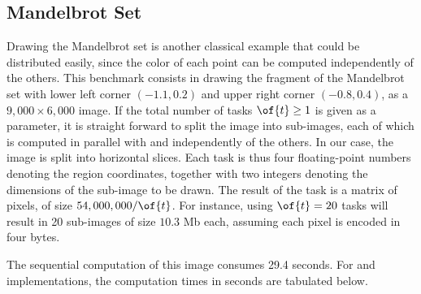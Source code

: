 \documentclass{llncs}
\newcommand{\Ocaml}{OCaml}
\begin{document}

\subsection{Mandelbrot Set}

Drawing the Mandelbrot set is another classical example that could be
distributed easily, since the color of each point can be computed
independently of the others. 
This benchmark consists in drawing the fragment of the Mandelbrot set
with lower left corner $(-1.1, 0.2)$ and upper right corner $(-0.8,
0.4)$, as a $9,000\times6,000$ image. 
%
If the total number of tasks $\of{t} \ge 1$ is given as a
parameter,  it is straight forward to split the image into  sub-images,
each of which is computed in parallel with and independently of the
others. In our case, the image is split into horizontal slices.
Each task is thus four floating-point numbers denoting the region
coordinates, together with two integers denoting the dimensions of the
sub-image to be drawn. The result of the task is a matrix of pixels,
of size $54,000,000 / \of{t}$. 
For instance, using $\of{t}=20$ tasks will
result in 20 sub-images of size $10.3$ Mb each,
assuming each pixel is encoded in four bytes.

The sequential computation of
this image consumes 29.4 seconds. For  and 
implementations, the computation times in seconds are tabulated below.
\end{document}
